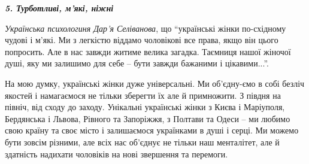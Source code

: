 \textbf{\emph{5. Турботливі, м'які, ніжні}}

\emph{Українська психологиня Дар'я Селіванова}, що \enquote{українські жінки по-східному
чудові і м'які. Ми з легкістю віддамо чоловікові все права, якщо він цього
попросить. Але в нас завжди житиме велика загадка. Таємниця нашої жіночої душі,
яку ми залишимо для себе – бути завжди бажаними і цікавими...}.

На мою думку, українські жінки дуже універсальні. Ми об'єдну\hyp{}ємо в собі безліч
якостей і намагаємося не тільки зберегти їх але й примножити. З півдня на
північ, від сходу до заходу. Унікальні українські жінки з Києва і Маріуполя,
Бердянська і Львова, Рівного та Запоріжжя, з Полтави та Одеси – ми любимо свою
країну та своє місто і залишаємося українками в душі і серці. Ми можемо бути
зовсім різними, але всіх нас об'єднує не тільки наш менталітет, але й здатність
надихати чоловіків на нові звершення та перемоги.
